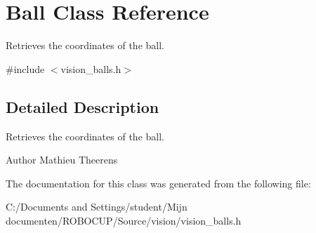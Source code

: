 \hypertarget{class_ball}{\section{Ball Class Reference}
\label{class_ball}
}


Retrieves the coordinates of the ball.  




{\ttfamily \#include $<$vision\-\_\-balls.\-h$>$}



\subsection{Detailed Description}
Retrieves the coordinates of the ball. 

\begin{DoxyAuthor}{Author}
Mathieu Theerens 
\end{DoxyAuthor}


The documentation for this class was generated from the following file\-:\begin{DoxyCompactItemize}
\item 
C\-:/\-Documents and Settings/student/\-Mijn documenten/\-R\-O\-B\-O\-C\-U\-P/\-Source/vision/vision\-\_\-balls.\-h\end{DoxyCompactItemize}

